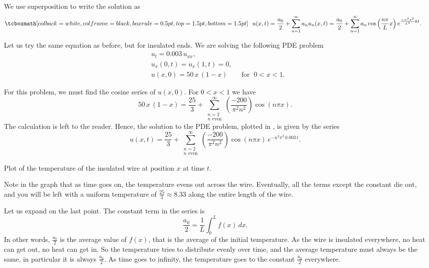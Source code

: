 We use superposition to write the solution as
\begin{equation*}
\mybxbg{~~
u(x,t) = 
\frac{a_0}{2} + 
\sum_{n=1}^\infty
a_n
u_n(x,t)
=
\frac{a_0}{2} + 
\sum_{n=1}^\infty
a_n
\cos \left( \frac{n \pi}{L} x \right)
e^{\frac{-n^2 \pi^2}{L^2} k t} .
~~}
\end{equation*}

\begin{example}
Let us try the same equation as before, but for insulated ends.
We are solving the following PDE problem
\begin{align*}
& u_t = 0.003 \, u_{xx} , \\
& u_x(0,t) = u_x(1,t) = 0 , \\
& u(x,0) = 50\,x\,(1-x) \qquad \text{for } \; 0 < x < 1 .
\end{align*}

For this problem, we must find the cosine series of $u(x,0)$.
For $0 < x < 1$ we have
\begin{equation*}
50\, x\,(1-x)
=
\frac{25}{3} +
\sum_{\substack{n=2 \\ n \text{ even}}}^\infty
\left( \frac{-200}{\pi^2 n^2} \right)
\cos (n \pi x) .
\end{equation*}
The calculation is left to the reader.
Hence, the solution to the PDE problem, plotted in
, is given by the series
\begin{equation*}
u(x,t)
=
\frac{25}{3} +
\sum_{\substack{n=2 \\ n \text{ even}}}^\infty
\left( \frac{-200}{\pi^2 n^2} \right)
\cos ( n \pi x)
\, e^{-n^2 \pi^2 \, 0.003 \, t} .
\end{equation*}

\begin{myfig}
\capstart
{}
\caption{Plot of the temperature of the insulated wire at position $x$
at time $t$.\label{heat:wireisolexfig}}
\end{myfig}

Note in the graph
that as time goes on, the temperature evens out across the wire.  Eventually, all the
terms except the constant
die out, and you will be left with a uniform temperature
of $\frac{25}{3} \approx 8.33$ along the entire length of the wire.
\end{example}

Let us expand on the last point.  The constant term in the series is
\begin{equation*}
\frac{a_0}{2} = \frac{1}{L} \int_0^L f(x) \, dx .
\end{equation*}
In other words, $\frac{a_0}{2}$ is the average value of $f(x)$, that is
the average of the initial temperature.  As the wire is insulated
everywhere, no heat can get out, no heat can get in.  So the temperature
tries to distribute evenly over time, and the average temperature must always be the
same, in particular it is always $\frac{a_0}{2}$.  As time goes to
infinity, the temperature goes to the constant $\frac{a_0}{2}$ everywhere.


